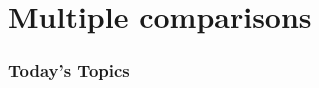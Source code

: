 \documentclass[color=usenames,dvipsnames]{beamer}\usepackage[]{graphicx}\usepackage[]{color}
\begin{document}



\section{Multiple comparisons}





\begin{frame}[plain]
  \frametitle{Today's Topics}
  \LARGE
  \tableofcontents[currentsection]
\end{frame}




\end{document}
